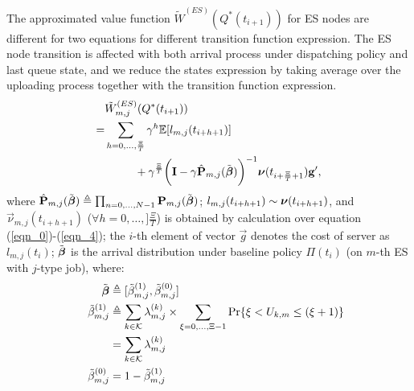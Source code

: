 The approximated value function $\tilde{W}^{(ES)}(Q^*(t_{i+1}))$ for ES nodes are different for two equations for different transition function expression.
The ES node transition is affected with both arrival process under dispatching policy and last queue state, and we reduce the states expression by taking average over the uploading process together with the transition function expression.
\begin{align}
    &\tilde{W}^{(ES)}_{m,j}(Q^*(t_{i+1})) %
    \nonumber\\
    =& \sum_{h=0,\dots,\frac{\Xi}{T}} \gamma^{h} \mathbb{E}[ l_{m,j}(t_{i+h+1}) ]
    \nonumber\\
    &~~~~~~~~+ \gamma^{\frac{\Xi}{T}} \Paren{ \mat{I} - \gamma \hat{\mat{P}}_{m,j}(\tilde{\vecG{\beta}}) }^{-1} \vecG{\nu}(t_{i+\frac{\Xi}{T}+1}) \vec{g}',
\end{align}
where $\hat{\mathbf{P}}_{m,j}(\tilde{\boldsymbol{\beta}}) \triangleq \prod_{n=0,\dots,N-1} \mathbf{P}_{m,j}(\tilde{\boldsymbol{\beta}})$;
$l_{m,j}(t_{i+h+1}) \sim \boldsymbol{\nu}(t_{i+h+1})$, and $\vec{\nu}_{m,j}(t_{i+h+1})$ ($\forall h=0,\dots,]\frac{\Xi}{T}$) is obtained by calculation over equation (\ref{eqn_0})-(\ref{eqn_4});
the $i$-th element of vector $\vec{g}$ denotes the cost of server as $l_{m,j}(t_i)$;
$\tilde{\boldsymbol{\beta}}$ is the arrival distribution under baseline policy $\Pi(t_{i})$ (on $m$-th ES with $j$-type job), where:
\begin{align}
    ~~~~\tilde{\boldsymbol{\beta}} &\triangleq [\tilde{\beta}^{(1)}_{m,j}, \tilde{\beta}^{(0)}_{m,j}]
    \\
    ~~~~\tilde{\beta}^{(1)}_{m,j} &\triangleq \sum_{k\in\mathcal{K}} \lambda^{(k)}_{m,j} \times \sum_{\xi=0,\dots,\Xi-1} \Pr\{ \xi<U_{k,m}\leq(\xi+1) \}
        \nonumber\\
    ~~~~&= \sum_{k\in\mathcal{K}} \lambda^{(k)}_{m,j}
    \\
    ~~~~\tilde{\beta}^{(0)}_{m,j} &= 1 - \tilde{\beta}^{(1)}_{m,j}
\end{align}


